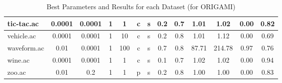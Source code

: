 \begin{table}[htbp]
\begin{tabular}{|l|c|c|c|c|c|c|c|c||c|c|c|c|}
		\hline
		tic-tac.ac     & 0.0001   & 0.0001      & 1              & 1        & c                   & s        & 0.2    & 0.7   & 1.01           & 1.02           & 0.00           & 0.82           \\
		\hline
		vehicle.ac     & 0.0001   & 0.0001      & 1              & 10       & c                   & s        & 0.2    & 0.8   & 1.01           & 1.12           & 0.00           & 0.69           \\
		\hline
		waveform.ac    & 0.01     & 0.0001      & 1              & 100      & c                   & s        & 0.7    & 0.8   & 87.71          & 214.78         & 0.97           & 0.76           \\
		\hline
		wine.ac        & 0.0001   & 0.0001      & 1              & 1        & c                   & s        & 0.1    & 0.7   & 1.02           & 1.02           & 0.00           & 0.94           \\
		\hline
		zoo.ac         & 0.01     & 0.2         & 1              & 1        & p                   & s        & 0.2    & 0.8   & 1.00           & 1.00           & 0.00           & 0.83           \\
		\hline
		\end{tabular}
	\caption{Best Parameters and Results for each Dataset (for ORIGAMI)}
	\label{tab:best_runs_for_each_db_origami}
\end{table}